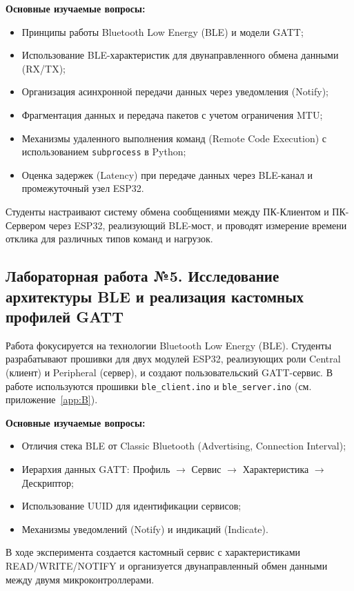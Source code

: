 \textbf{Основные изучаемые вопросы:}
\begin{itemize}[nosep]
    \item Принципы работы Bluetooth Low Energy (BLE) и модели GATT;
    \item Использование BLE-характеристик для двунаправленного обмена данными (RX/TX);
    \item Организация асинхронной передачи данных через уведомления (Notify);
    \item Фрагментация данных и передача пакетов с учетом ограничения MTU;
    \item Механизмы удаленного выполнения команд (Remote Code Execution) с использованием \texttt{subprocess} в Python;
    \item Оценка задержек (Latency) при передаче данных через BLE-канал и промежуточный узел ESP32.
\end{itemize}

Студенты настраивают систему обмена сообщениями между ПК-Клиентом и ПК-Сервером через ESP32, реализующий BLE-мост, и проводят измерение времени отклика для различных типов команд и нагрузок.

\subsection{Лабораторная работа №5. Исследование архитектуры BLE и реализация кастомных профилей GATT}
Работа фокусируется на технологии Bluetooth Low Energy (BLE). Студенты разрабатывают прошивки для двух модулей ESP32, реализующих роли Central (клиент) и Peripheral (сервер), и создают пользовательский GATT-сервис. В работе используются прошивки \texttt{ble\_client.ino} и \texttt{ble\_server.ino} (см. приложение~\ref{app:B}).

\textbf{Основные изучаемые вопросы:}
\begin{itemize}[nosep]
    \item Отличия стека BLE от Classic Bluetooth (Advertising, Connection Interval);
    \item Иерархия данных GATT: Профиль $\rightarrow$ Сервис $\rightarrow$ Характеристика $\rightarrow$ Дескриптор;
    \item Использование UUID для идентификации сервисов;
    \item Механизмы уведомлений (Notify) и индикаций (Indicate).
\end{itemize}
В ходе эксперимента создается кастомный сервис с характеристиками READ/WRITE/NOTIFY и организуется двунаправленный обмен данными между двумя микроконтроллерами.

